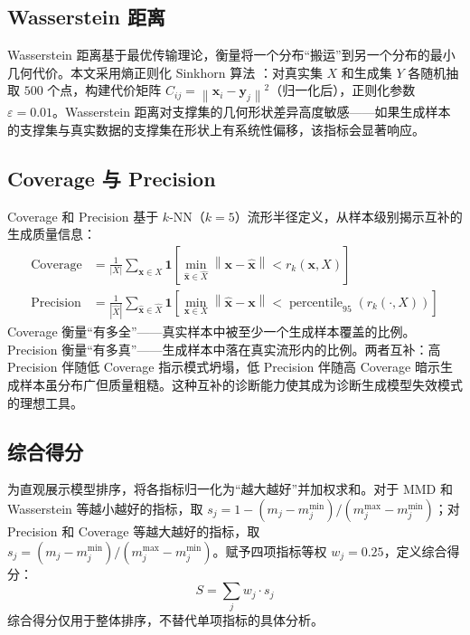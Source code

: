 \documentclass[10pt, a4paper, oneside]{ctexart}
\numberwithin{equation}{section}
\numberwithin{table}{section}
\numberwithin{figure}{section}
\newcommand{\norm}[1]{\left\| #1 \right\|}
\newcommand{\vect}[1]{\mathbf{#1}}
\begin{document}
\subsection{Wasserstein 距离}

Wasserstein 距离基于最优传输理论，衡量将一个分布“搬运”到另一个分布的最小几何代价。本文采用熵正则化 Sinkhorn 算法 \cite{rabin2011swd}：对真实集 $X$ 和生成集 $Y$ 各随机抽取 $500$ 个点，构建代价矩阵 $C_{ij}=\norm{\vect{x}_i-\vect{y}_j}^2$（归一化后），正则化参数 $\varepsilon=0.01$。Wasserstein 距离对支撑集的几何形状差异高度敏感——如果生成样本的支撑集与真实数据的支撑集在形状上有系统性偏移，该指标会显著响应。

\subsection{Coverage 与 Precision}

Coverage 和 Precision \cite{kyukaaniemi2019prdc} 基于 $k$-NN（$k=5$）流形半径定义，从样本级别揭示互补的生成质量信息：
\begin{align}
    \operatorname{Coverage} &= \frac{1}{|X|}\sum_{\vect{x}\in X} \mathbf{1}\!\left[\min_{\hat{\vect{x}}\in \hat{X}}\norm{\vect{x} - \hat{\vect{x}}} < r_k(\vect{x},X)\right] \\
    \operatorname{Precision} &= \frac{1}{|\hat{X}|}\sum_{\hat{\vect{x}}\in \hat{X}} \mathbf{1}\!\left[\min_{\vect{x}\in X}\norm{\hat{\vect{x}} - \vect{x}} < \operatorname{percentile}_{95}(r_k(\cdot,X))\right]
\end{align}
Coverage 衡量“有多全”——真实样本中被至少一个生成样本覆盖的比例。Precision 衡量“有多真”——生成样本中落在真实流形内的比例。两者互补：高 Precision 伴随低 Coverage 指示模式坍塌，低 Precision 伴随高 Coverage 暗示生成样本虽分布广但质量粗糙。这种互补的诊断能力使其成为诊断生成模型失效模式的理想工具。

\subsection{综合得分}

为直观展示模型排序，将各指标归一化为“越大越好”并加权求和。对于 MMD 和 Wasserstein 等越小越好的指标，取 $s_j = 1 - (m_j - m_j^{\min}) / (m_j^{\max} - m_j^{\min})$；对 Precision 和 Coverage 等越大越好的指标，取 $s_j = (m_j - m_j^{\min}) / (m_j^{\max} - m_j^{\min})$。赋予四项指标等权 $w_j = 0.25$，定义综合得分：
\begin{equation}
    S = \sum_{j} w_j \cdot s_j
\end{equation}
综合得分仅用于整体排序，不替代单项指标的具体分析。
\end{document}
